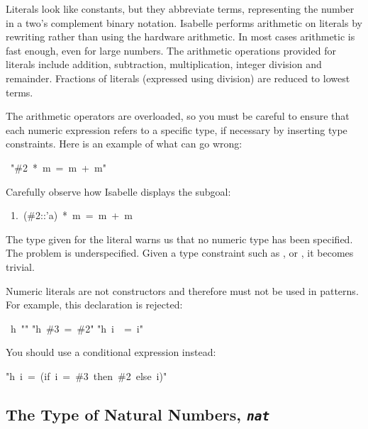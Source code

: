 Literals look like constants, but they abbreviate 
terms, representing the number in a two's complement binary notation. 
Isabelle performs arithmetic on literals by rewriting rather 
than using the hardware arithmetic. In most cases arithmetic 
is fast enough, even for large numbers. The arithmetic operations 
provided for literals include addition, subtraction, multiplication, 
integer division and remainder.  Fractions of literals (expressed using
division) are reduced to lowest terms.

\begin{warn}
The arithmetic operators are 
overloaded, so you must be careful to ensure that each numeric 
expression refers to a specific type, if necessary by inserting 
type constraints.  Here is an example of what can go wrong:
\par
\begin{isabelle}
\ "\#2\ *\ m\ =\ m\ +\ m"
\end{isabelle}
%
Carefully observe how Isabelle displays the subgoal:
\begin{isabelle}
\ 1.\ (\#2::'a)\ *\ m\ =\ m\ +\ m
\end{isabelle}
The type  given for the literal  warns us that no numeric
type has been specified.  The problem is underspecified.  Given a type
constraint such as ,  or , it becomes trivial.
\end{warn}

\begin{warn}
Numeric literals are not constructors and therefore
must not be used in patterns.  For example, this declaration is
rejected:
\begin{isabelle}
\ h\ "\isacharbraceleft \isacharbraceright "\isanewline
"h\ \#3\ =\ \#2"\isanewline
"h\ i\ \ =\ i"
\end{isabelle}

You should use a conditional expression instead:
\begin{isabelle}
"h\ i\ =\ (if\ i\ =\ \#3\ then\ \#2\ else\ i)"
\end{isabelle}
\end{warn}



\subsection{The Type of Natural Numbers, {\tt\slshape nat}}

